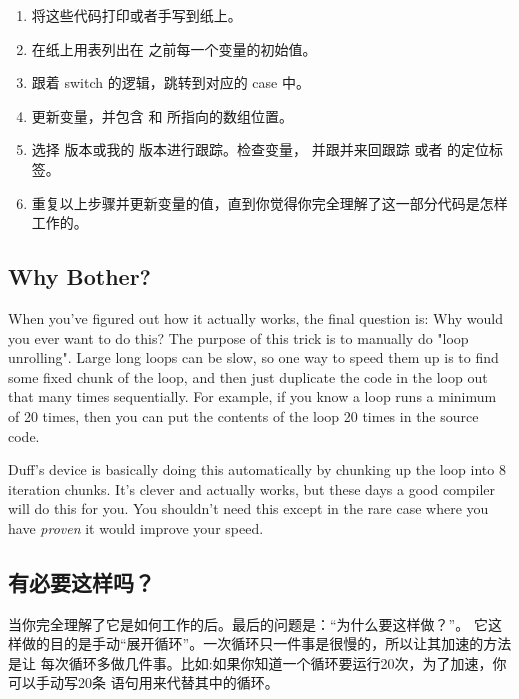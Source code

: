 \begin{enumerate}
\item 将这些代码打印或者手写到纸上。

\item 在纸上用表列出在  之前每一个变量的初始值。

\item 跟着 switch 的逻辑，跳转到对应的 case 中。

\item 更新变量，并包含  和  所指向的数组位置。

\item 选择 版本或我的  版本进行跟踪。检查变量，
	并跟并来回跟踪  或者  的定位标签。

\item 重复以上步骤并更新变量的值，直到你觉得你完全理解了这一部分代码是怎样工作的。
\end{enumerate}


\subsection{Why Bother?}

When you've figured out how it actually works, the final question is: Why would
you ever want to do this?  The purpose of this trick is to manually do "loop
unrolling".  Large long loops can be slow, so one way to speed them up is to
find some fixed chunk of the loop, and then just duplicate the code in the loop
out that many times sequentially.  For example, if you know a loop runs a
minimum of 20 times, then you can put the contents of the loop 20 times in the
source code.


Duff's device is basically doing this automatically by chunking up the loop
into 8 iteration chunks.  It's clever and actually works, but these days a good
compiler will do this for you.  You shouldn't need this except in the rare case
where you have \emph{proven} it would improve your speed.

\subsection{有必要这样吗？}
当你完全理解了它是如何工作的后。最后的问题是：“为什么要这样做？”。
它这样做的目的是手动“展开循环”。一次循环只一件事是很慢的，所以让其加速的方法是让
每次循环多做几件事。比如:如果你知道一个循环要运行20次，为了加速，你可以手动写20条
语句用来代替其中的循环。

